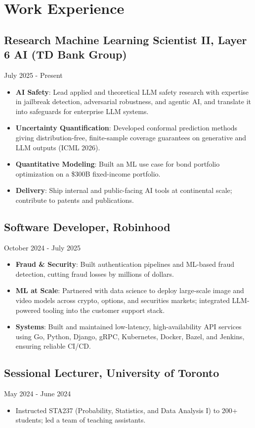 \section{Work Experience}
\subsection{Research Machine Learning Scientist II, Layer 6 AI (TD Bank Group)}{July 2025 - Present}
\begin{itemize}[leftmargin=*]
\item \textbf{AI Safety}: Lead applied and theoretical LLM safety research with expertise in jailbreak detection, adversarial robustness, and agentic AI, and translate it into safeguards for enterprise LLM systems.
\item \textbf{Uncertainty Quantification}: Developed conformal prediction methods giving distribution-free, finite-sample coverage guarantees on generative and LLM outputs (ICML 2026).
\item \textbf{Quantitative Modeling}: Built an ML use case for bond portfolio optimization on a \$300B fixed-income portfolio.
\item \textbf{Delivery}: Ship internal and public-facing AI tools at continental scale; contribute to patents and publications.
\end{itemize}

\subsection{Software Developer, Robinhood}{October 2024 - July 2025}
\begin{itemize}[leftmargin=*]
\item \textbf{Fraud \& Security}: Built authentication pipelines and ML-based fraud detection, cutting fraud losses by millions of dollars.
\item \textbf{ML at Scale}: Partnered with data science to deploy large-scale image and video models across crypto, options, and securities markets; integrated LLM-powered tooling into the customer support stack.
\item \textbf{Systems}: Built and maintained low-latency, high-availability API services using Go, Python, Django, gRPC, Kubernetes, Docker, Bazel, and Jenkins, ensuring reliable CI/CD.
\end{itemize}
\subsection{Sessional Lecturer, University of Toronto}{May 2024 - June 2024}
\begin{itemize}[leftmargin=*]
\item Instructed STA237 (Probability, Statistics, and Data Analysis I) to 200+ students; led a team of teaching assistants.
\end{itemize}

